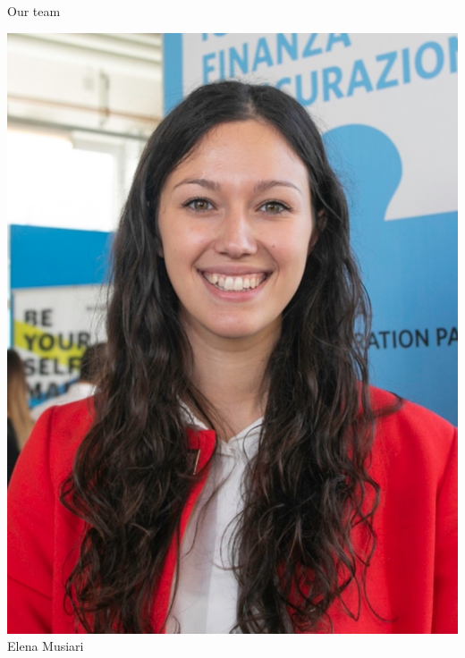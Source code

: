 \documentclass{beamer}
\begin{document}
\begin{frame}{Our team}
\begin{minipage}{0.24\textwidth}
\begin{center}
		\includegraphics[width=\columnwidth]{elenataglio.jpg}
		Elena Musiari
	\end{center}
\end{minipage}
\hfill
\begin{minipage}{0.24\textwidth}
	\begin{center}%

\end{center}
\end{minipage}
\end{frame}
\end{document}
